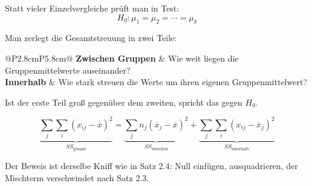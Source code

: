 \begin{merksatz}
Statt vieler Einzelvergleiche prüft man in  Test:
\[ H_0: \mu_1 = \mu_2 = \cdots = \mu_k \]

Man zerlegt die Gesamtstreuung in zwei Teile:

\begin{center}
\renewcommand{\arraystretch}{1.5}
\begin{tabular}{@{}P{2.8cm}P{5.8cm}@{}}
\toprule
\textbf{Zwischen Gruppen} & Wie weit liegen die Gruppenmittelwerte auseinander?\\
\textbf{Innerhalb} & Wie stark streuen die Werte um ihren eigenen Gruppenmittelwert?\\
\bottomrule
\end{tabular}
\end{center}

Ist der erste Teil groß gegenüber dem zweiten, spricht das gegen $H_0$.

\[ \underbrace{\sum_{j}\sum_{i}(x_{ij}-\overline x)^2}_{SS_{\text{gesamt}}} = \underbrace{\sum_j n_j(\overline x_j - \overline x)^2}_{SS_{\text{zwischen}}} + \underbrace{\sum_j\sum_i (x_{ij}-\overline x_j)^2}_{SS_{\text{innerhalb}}} \]

Der Beweis ist derselbe Kniff wie in Satz 2.4: Null einfügen, ausquadrieren, der Mischterm verschwindet nach Satz 2.3.
\end{merksatz}

